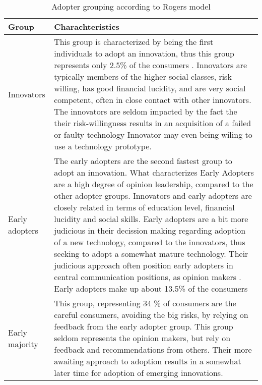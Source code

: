 \documentclass[journal]{IEEEtran}
\begin{document}
\begin{table}[ht]

\caption{Adopter grouping according to Rogers model} %
\centering  %

\begin{tabular}{|p{2cm} |p{5.5cm}|} %
\hline\hline                        %

Group & Charachteristics\\ [0.5ex] %
\hline                  %

Innovators &			%
This group is characterized by being the first individuals to adopt 
an innovation, thus this group represents only 2.5\% of the consumers \cite{diffusion2}. 
Innovators are typically members of the higher social classes, 
risk willing, has good financial lucidity, and are very social competent, 
often in close contact with other innovators. 
The innovators are seldom impacted by the fact the their risk-willingness results in an acquisition of a failed or faulty technology \cite{rogers_model} 
Innovator may even being wiling to use a technology prototype.  \\ %
\hline

Early adopters & 
The early adopters are the second fastest group to adopt an innovation. What characterizes Early Adopters are a high degree of opinion leadership, compared to the other adopter groups. Innovators and early adopters are closely related in terms of education level, financial lucidity and social skills. Early adopters are a bit more judicious in their decission making regarding adoption of a new technology, compared to the innovators, thus seeking to adopt a somewhat mature technology. Their judicious approach often position early adopters in central communication positions, as opinion makers \cite{rogers_model}.
Early adopters make up about 13.5\% of the consumers \cite{diffusion2} \\
\hline

Early majority &  
This group, representing 34 \% of consumers \cite{diffusion2} are the careful consumers, avoiding the big risks, by relying on feedback from the early adopter group. 
This group seldom represents the opinion makers, but rely on feedback and recommendations from others. Their more awaiting approach to adoption results in a somewhat later time for adoption of emerging innovations\cite{rogers_model}.\\
\hline


\end{tabular}
\end{table}
\end{document}
